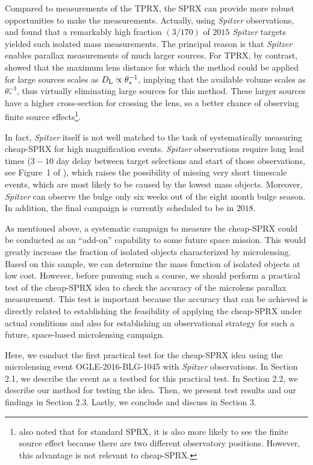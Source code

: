 \documentclass[10pt]{emulateapj}
\begin{document}
 Compared to measurements of the TPRX, the SPRX can provide more robust opportunities to make the measurements. 
Actually, using {\it Spitzer} observations, \citet{zhu16} and \citet{chung17} found that a remarkably high 
fraction $(3/170)$ of $2015$ {\it Spitzer} targets yielded such isolated mass measurements. The principal reason 
is that {\it Spitzer} enables parallax measurements of much larger sources. For TPRX, by contrast, \citet{gould13} 
showed that the maximum lens distance for which the method could be applied for large sources scales as 
$D_{\rm L}\propto \theta_{\ast}^{-1}$, implying that the available volume scales as $\theta_{\ast}^{-3}$, thus 
virtually eliminating large sources for this method. These larger sources have a higher cross-section for crossing 
the lens, so a better chance of observing finite source effects\footnote[1]{\citet{zhu16} also noted that for standard 
SPRX, it is also more likely to see the finite source effect because there are two different observatory positions. 
However, this advantage is not relevant to cheap-SPRX.}.

 In fact, {\it Spitzer} itself is not well matched to the task of systematically measuring cheap-SPRX 
for high magnification events. {\it Spitzer} observations require long lead times ($3-10$ day delay 
between target selections and start of those observations, see Figure~1 of \citealt{udalski15b}), 
which raises the possibility of missing very short timescale events, which are most likely to be 
caused by the lowest mass objects. Moreover, {\it Spitzer} can observe the bulge only six weeks 
out of the eight month bulge season. In addition, the final campaign is currently scheduled 
to be in $2018$.

 As mentioned above, a systematic campaign to measure the cheap-SPRX could be conducted as an ``add-on'' 
capability to some future space mission. This would greatly increase the fraction of isolated objects 
characterized by microlensing. Based on this sample, we can determine the mass function of isolated objects 
at low cost. However, before pursuing such a course, we should perform a practical test of the cheap-SPRX 
idea to check the accuracy of the microlens parallax measurement. This test is important because 
the accuracy that can be achieved is directly related to establishing the feasibility of applying the cheap-SPRX 
under actual conditions and also for establishing an observational strategy for such a future, 
space-based microlensing campaign.
 
 Here, we conduct the first practical test for the cheap-SPRX idea using the microlensing event OGLE-2016-BLG-1045 
with {\it Spitzer} observations. In Section 2.1, we describe the event as a testbed for this practical test. 
In Section 2.2, we describe our method for testing the idea. Then, we present test results and our findings in 
Section 2.3. Lastly, we conclude and discuss in Section 3.
\end{document}
